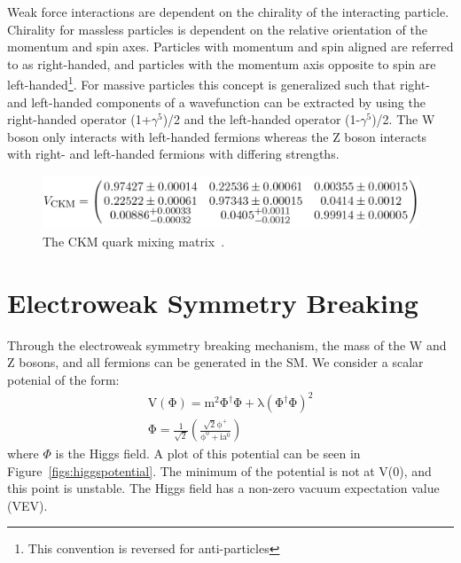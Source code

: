 Weak force interactions are dependent on the chirality of the interacting particle.
Chirality for massless particles is dependent on the relative orientation of the momentum and spin axes.  
Particles with momentum and spin aligned are referred to as right-handed, and particles with the momentum 
axis opposite to spin are left-handed\footnote{This convention is reversed for anti-particles}.
For massive particles this concept is generalized such that right- and left-handed components of a wavefunction 
can be extracted by using the right-handed operator (1+$\gamma^5$)/2 and the left-handed operator (1-$\gamma^5$)/2.  
The W boson only interacts with left-handed fermions whereas the Z boson interacts with right- and left-handed fermions with differing strengths. 

\begin{figure}
\begin{center}
\includegraphics[width=1.0\linewidth]{figs/CKM.png}
\caption{The CKM quark mixing matrix~\cite{PDG-2014}.}
\label{figs:CKM}
\end{center}
\end{figure}



\section{Electroweak Symmetry Breaking}
Through the electroweak symmetry breaking mechanism, the mass of the W and Z bosons, and all fermions can be generated in the SM.  
We consider a scalar potenial of the form:
\begin{eqnarray}
\mathrm{ V(\Phi) = m^{2} \Phi^{\dagger} \Phi + \lambda ( \Phi^{\dagger} \Phi )^{2}  }\\
\mathrm{\Phi = \frac{1}{\sqrt{2}} \left( \frac{\sqrt{2} \phi^{+}}{\phi^{0} + ia^{0}}  \right)}
\end{eqnarray}  
where $\Phi$ is the Higgs field.  A plot of this potential can be seen in Figure~\ref{figs:higgspotential}.  
The minimum of the potential is not at V(0), and this point is unstable.  
The Higgs field has a non-zero vacuum expectation value (VEV).

